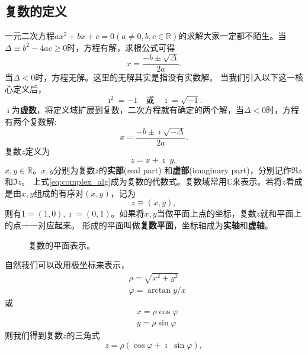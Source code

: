 


\subsection{复数的定义}
一元二次方程$a x^2 + b x + c = 0 (a\neq 0, b,c \in \mathbb{R})$的求解大家一定都不陌生。当$\Delta \equiv b^2 - 4 a c \geq 0$时，方程有解，求根公式可得
\begin{equation}
    x = \frac{-b \pm \sqrt{\Delta}}{2a} .
\end{equation}
当$\Delta < 0$时，方程无解。这里的无解其实是指没有实数解。
当我们引入以下这一核心定义后，
\begin{equation}
    \imath ^2 = -1 \quad \textrm{或} \quad \imath = \sqrt{-1} . 
\end{equation}
$\imath$为{\bf 虚数}，将定义域扩展到复数，二次方程就有确定的两个解，当$\Delta < 0$时，方程有两个复数解:
\begin{equation}
    x = \frac{-b \pm \imath \sqrt{-\Delta}}{2a} .
\end{equation}
复数$z$定义为
\begin{equation}
    \label{eq:complex_alg}
    z = x + \imath \; y ,
\end{equation}
$x,y \in {\mathbb{R}}$。$x,y$分别为复数$z$的{\bf 实部}(real part) 和{\bf 虚部}(imaginary part)，分别记作$\Re z$和$\Im z$。
上式\eqref{eq:complex_alg}成为复数的代数式。复数域常用$\mathbb{C}$来表示。若将$z$看成是由$x,y$组成的有序对$(x,y)$，记为
\begin{equation}
    z \equiv (x,y),
\end{equation}
则有$1 = (1,0), \imath = (0, 1)$。如果将$x,y$当做平面上点的坐标，复数$z$就和平面上的点一一对应起来。
形成的平面叫做{\bf 复数平面}，坐标轴成为{\bf 实轴}和{\bf 虚轴}。
\begin{figure}[htb]
    \centering
    
  \caption{复数的平面表示。} \label{fig:complex_plane}
\end{figure} 
自然我们可以改用极坐标来表示，
\begin{align}
    & \rho = \sqrt{x^2 + y^2}\\
    & \varphi = \arctan y/x
\end{align}
或
\begin{align}
    & x = \rho \cos\varphi \\
    & y = \rho \sin\varphi 
\end{align}
则我们得到复数$z$的三角式
\begin{equation}
    z = \rho (\cos\varphi +  \imath\; \sin\varphi) ,
\end{equation}
